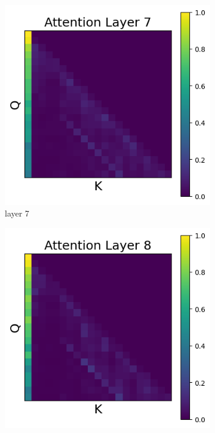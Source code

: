 \documentclass[11pt]{article}
\begin{document}
\begin{figure}[t]
    \begin{subfigure}[t]{0.24\textwidth}
    \centering
    \includegraphics[width=1.4\columnwidth]{figures/intervention4/layer_7.png}
    \caption{layer 7}
  \end{subfigure}\hfill
      \begin{subfigure}[t]{0.24\textwidth}
    \centering
    \includegraphics[width=1.4\columnwidth]{figures/intervention4/layer_8.png}

\end{subfigure}
\end{figure}
\end{document}
